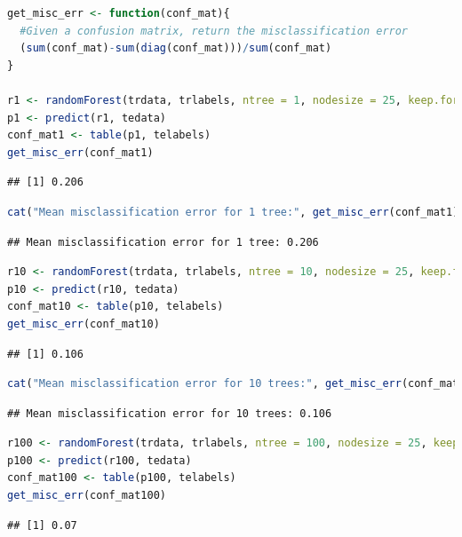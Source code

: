 \documentclass[
]{article}
\begin{document}
\begin{lstlisting}[language=R]
get_misc_err <- function(conf_mat){
  #Given a confusion matrix, return the misclassification error
  (sum(conf_mat)-sum(diag(conf_mat)))/sum(conf_mat)
}

r1 <- randomForest(trdata, trlabels, ntree = 1, nodesize = 25, keep.forest = TRUE)
p1 <- predict(r1, tedata)
conf_mat1 <- table(p1, telabels)
get_misc_err(conf_mat1)
\end{lstlisting}

\begin{lstlisting}
## [1] 0.206
\end{lstlisting}

\begin{lstlisting}[language=R]
cat("Mean misclassification error for 1 tree:", get_misc_err(conf_mat1), "\n")
\end{lstlisting}

\begin{lstlisting}
## Mean misclassification error for 1 tree: 0.206
\end{lstlisting}

\begin{lstlisting}[language=R]
r10 <- randomForest(trdata, trlabels, ntree = 10, nodesize = 25, keep.forest = TRUE)
p10 <- predict(r10, tedata)
conf_mat10 <- table(p10, telabels)
get_misc_err(conf_mat10)
\end{lstlisting}

\begin{lstlisting}
## [1] 0.106
\end{lstlisting}

\begin{lstlisting}[language=R]
cat("Mean misclassification error for 10 trees:", get_misc_err(conf_mat10), "\n")
\end{lstlisting}

\begin{lstlisting}
## Mean misclassification error for 10 trees: 0.106
\end{lstlisting}

\begin{lstlisting}[language=R]
r100 <- randomForest(trdata, trlabels, ntree = 100, nodesize = 25, keep.forest = TRUE)
p100 <- predict(r100, tedata)
conf_mat100 <- table(p100, telabels)
get_misc_err(conf_mat100)
\end{lstlisting}

\begin{lstlisting}
## [1] 0.07
\end{lstlisting}
\end{document}
